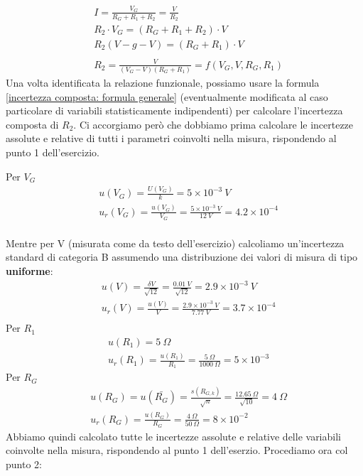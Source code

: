 \documentclass[a4paper,11pt]{report}
\begin{document}
\begin{align*}
  &I = \frac{V_G}{R_G+R_1+R_2} = \frac{V}{R_2}\\
  &R_2\cdot V_G = (R_G+R_1+R_2)\cdot V\\
  &R_2(V-g-V) = (R_G+R_1)\cdot V \\ \\
  &R_2 = \frac{V}{(V_G-V)(R_G+R_1)} = f(V_G,V,R_G,R_1)
\end{align*}
Una volta identificata la relazione funzionale, possiamo usare la formula \ref{incertezza composta: formula generale} (eventualmente modificata al caso particolare di variabili statisticamente indipendenti) per calcolare l'incertezza composta di $R_2$. Ci accorgiamo però che dobbiamo prima calcolare le incertezze assolute e relative di tutti i parametri coinvolti nella misura, rispondendo al punto 1 dell'esercizio.

Per $V_G$
\begin{align*}
  &u(V_G) = \frac{U(V_G)}{k} = 5\times 10^{-3}~V \\
  &u_r(V_G) = \frac{u(V_G)}{V_G} = \frac{5\times 10^{-3}~V}{12~V} = 4.2\times 10^{-4}\\
\end{align*}

Mentre per V (misurata come da testo dell'esercizio) calcoliamo un'incertezza standard di categoria B assumendo una distribuzione dei valori di misura di tipo \textbf{uniforme}:
\footnotemark[1]
\begin{align*}
  &u(V) = \frac{\delta V}{\sqrt{12}} = \frac{0.01~V}{\sqrt{12}} = 2.9\times 10^{-3}~V\\
  &u_r(V) = \frac{u(V)}{V} = \frac{2.9\times 10^{-3}~V}{7.77~V} = 3.7\times 10^{-4}\\
\end{align*}
Per $R_1$
\begin{align*}
  &u(R_1) = 5~\Omega \\
  &u_r(R_1) = \frac{u(R_1)}{R_1} = \frac{5~\Omega}{1000~\Omega} = 5\times 10^{-3}
\end{align*}
Per $R_G$
\begin{align*}
  &u(R_G) = u(\bar{R_G}) = \frac{s(R_{G,k})}{\sqrt{n}} = \frac{12.65~\Omega}{\sqrt{10}} = 4~\Omega \\
  &u_r(R_G) = \frac{u(R_G)}{R_G} = \frac{4~\Omega}{50~\Omega} = 8\times 10^{-2}
\end{align*}
Abbiamo quindi calcolato tutte le incertezze assolute e relative delle variabili coinvolte nella misura, rispondendo al punto 1 dell'eserzio. Procediamo ora col punto 2:
\end{document}
